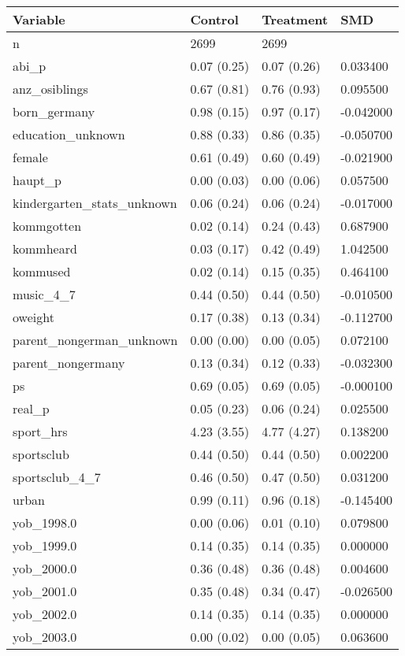 \begin{tabular}{llll}
\toprule
Variable & Control & Treatment & SMD \\
\midrule
n & 2699 & 2699 &  \\
abi\_p & 0.07 (0.25) & 0.07 (0.26) & 0.033400 \\
anz\_osiblings & 0.67 (0.81) & 0.76 (0.93) & 0.095500 \\
born\_germany & 0.98 (0.15) & 0.97 (0.17) & -0.042000 \\
education\_unknown & 0.88 (0.33) & 0.86 (0.35) & -0.050700 \\
female & 0.61 (0.49) & 0.60 (0.49) & -0.021900 \\
haupt\_p & 0.00 (0.03) & 0.00 (0.06) & 0.057500 \\
kindergarten\_stats\_unknown & 0.06 (0.24) & 0.06 (0.24) & -0.017000 \\
kommgotten & 0.02 (0.14) & 0.24 (0.43) & 0.687900 \\
kommheard & 0.03 (0.17) & 0.42 (0.49) & 1.042500 \\
kommused & 0.02 (0.14) & 0.15 (0.35) & 0.464100 \\
music\_4\_7 & 0.44 (0.50) & 0.44 (0.50) & -0.010500 \\
oweight & 0.17 (0.38) & 0.13 (0.34) & -0.112700 \\
parent\_nongerman\_unknown & 0.00 (0.00) & 0.00 (0.05) & 0.072100 \\
parent\_nongermany & 0.13 (0.34) & 0.12 (0.33) & -0.032300 \\
ps & 0.69 (0.05) & 0.69 (0.05) & -0.000100 \\
real\_p & 0.05 (0.23) & 0.06 (0.24) & 0.025500 \\
sport\_hrs & 4.23 (3.55) & 4.77 (4.27) & 0.138200 \\
sportsclub & 0.44 (0.50) & 0.44 (0.50) & 0.002200 \\
sportsclub\_4\_7 & 0.46 (0.50) & 0.47 (0.50) & 0.031200 \\
urban & 0.99 (0.11) & 0.96 (0.18) & -0.145400 \\
yob\_1998.0 & 0.00 (0.06) & 0.01 (0.10) & 0.079800 \\
yob\_1999.0 & 0.14 (0.35) & 0.14 (0.35) & 0.000000 \\
yob\_2000.0 & 0.36 (0.48) & 0.36 (0.48) & 0.004600 \\
yob\_2001.0 & 0.35 (0.48) & 0.34 (0.47) & -0.026500 \\
yob\_2002.0 & 0.14 (0.35) & 0.14 (0.35) & 0.000000 \\
yob\_2003.0 & 0.00 (0.02) & 0.00 (0.05) & 0.063600 \\
\bottomrule
\end{tabular}
